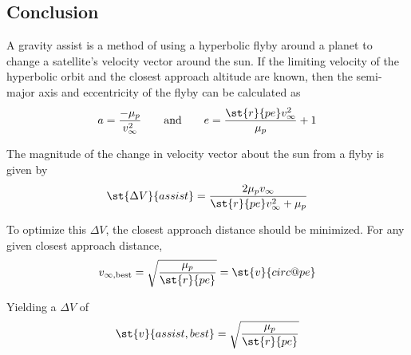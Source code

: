 \documentclass[../basicOrbitalDynamics.tex]{subfiles}
\begin{document}

\bigskip\bigskip
\subsection{Conclusion}

A gravity assist is a method of using a hyperbolic flyby around a planet to change a satellite's velocity vector around the sun. If the limiting velocity of the hyperbolic orbit and the closest approach altitude are known, then the semi-major axis and eccentricity of the flyby can be calculated as
$$a=\frac{-\mu_p}{v_\infty^2}\qquad\text{and}\qquad e=\frac{\st{r}{pe}v_\infty^2}{\mu_p}+1$$

The magnitude of the change in velocity vector about the sun from a flyby is given by
$$\st{\Delta V}{assist}=\frac{2\mu_p v_\infty}{\st{r}{pe}v_\infty^2+\mu_p}$$

To optimize this $\Delta V$, the closest approach distance should be minimized. For any given closest approach distance,
$$v_{\infty,\text{best}}=\sqrt{\frac{\mu_p}{\st{r}{pe}}}=\st{v}{circ@pe}$$

Yielding a $\Delta V$ of
$$\st{v}{assist,best} = \sqrt{\frac{\mu_p}{\st{r}{pe}}}$$
\end{document}
